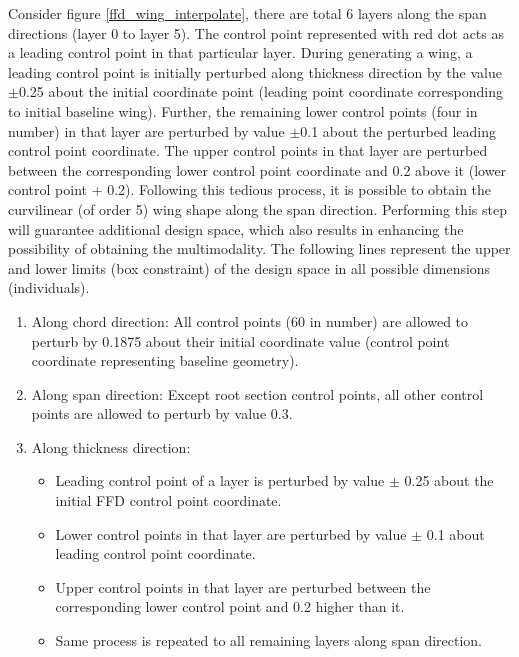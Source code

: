 Consider figure \ref{ffd_wing_interpolate}, there are total 6 layers along the span directions (layer 0 to layer 5). The control point represented with red dot acts as a leading control point in that particular layer. During generating a wing, a leading control point is initially perturbed along thickness direction by the value $ \pm $0.25 about the initial coordinate point (leading point coordinate corresponding to initial baseline wing). Further, the remaining lower control points (four in number) in that layer are perturbed by value $\pm$0.1 about the perturbed leading control point coordinate. The upper control points in that layer are perturbed between the corresponding lower control point coordinate and 0.2 above it (lower control point + 0.2). Following this tedious process, it is possible to obtain the curvilinear (of order 5) wing shape along the span direction. Performing this step will guarantee additional design space, which also results in enhancing the possibility of obtaining the multimodality. The following lines represent the upper and lower limits (box constraint) of the design space in all possible dimensions (individuals).

\begin{enumerate}
\item Along chord direction: All control points (60 in number) are allowed to perturb by 0.1875 about their initial coordinate value (control point coordinate representing baseline geometry).
\item Along span direction: Except root section control points, all other control points are allowed to perturb by value 0.3.
\item Along thickness direction: 
\begin{itemize}
\item Leading control point of a layer is perturbed by value  $\pm$ 0.25 about the initial FFD control point coordinate.
\item Lower control points in that layer are perturbed by value $\pm$ 0.1 about leading control point coordinate.
\item Upper control points in that layer are perturbed between the corresponding lower control point and 0.2 higher than it.  
\item Same process is repeated to all remaining layers along span direction.
\end{itemize}
\end{enumerate}


